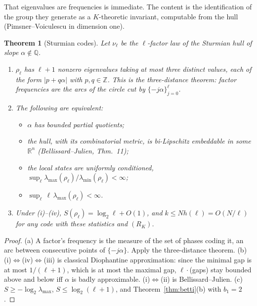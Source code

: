 \documentclass[11pt]{article}
\newtheorem{theorem}{Theorem}[section]
\theoremstyle{definition}
\theoremstyle{remark}
\newcommand{\Z}{\mathbb Z}
\newcommand{\R}{\mathbb R}
\newcommand{\Q}{\mathbb Q}
\begin{document}
That eigenvalues are frequencies is immediate. The content is the identification of the group they generate as a $K$-theoretic invariant, computable from the hull (Pimsner--Voiculescu in dimension one).

\begin{theorem}[Sturmian codes]\label{thm:sturm}
Let $\nu_\ell$ be the $\ell$-factor law of the Sturmian hull of slope $\alpha\notin\Q$.
\begin{enumerate}
\item[(a)] $\rho_\ell$ has $\ell+1$ nonzero eigenvalues taking at most three distinct values, each of the form $|p+q\alpha|$ with $p,q\in\Z$. This is the three-distance theorem: factor frequencies are the arcs of the circle cut by $\{-j\alpha\}_{j=0}^\ell$.
\item[(b)] The following are equivalent:
\begin{itemize}
\item[(i)] $\alpha$ has bounded partial quotients;
\item[(ii)] the hull, with its combinatorial metric, is bi-Lipschitz embeddable in some $\R^n$ (Bellissard--Julien, Thm.~11);
\item[(iii)] the local states are uniformly conditioned, $\sup_\ell\lambda_{\max}(\rho_\ell)/\lambda_{\min}(\rho_\ell)<\infty$;
\item[(iv)] $\sup_\ell\,\ell\,\lambda_{\max}(\rho_\ell)<\infty$.
\end{itemize}
\item[(c)] Under (i)--(iv), $S(\rho_\ell)=\log_2\ell+O(1)$, and $k\le Nh(\ell)=O(N/\ell)$ for any code with these statistics and $(R_K)$.
\end{enumerate}
\end{theorem}

\begin{proof}
(a) A factor's frequency is the measure of the set of phases coding it, an arc between consecutive points of $\{-j\alpha\}$. Apply the three-distance theorem. (b) (i)$\Leftrightarrow$(iv)$\Leftrightarrow$(iii) is classical Diophantine approximation: since the minimal gap is at most $1/(\ell+1)$, which is at most the maximal gap, $\ell\cdot$(gaps) stay bounded above and below iff $\alpha$ is badly approximable. (i)$\Leftrightarrow$(ii) is Bellissard--Julien. (c) $S\ge-\log_2\lambda_{\max}$, $S\le\log_2(\ell+1)$, and Theorem~\ref{thm:betti}(b) with $b_1=2$.
\end{proof}
\end{document}
